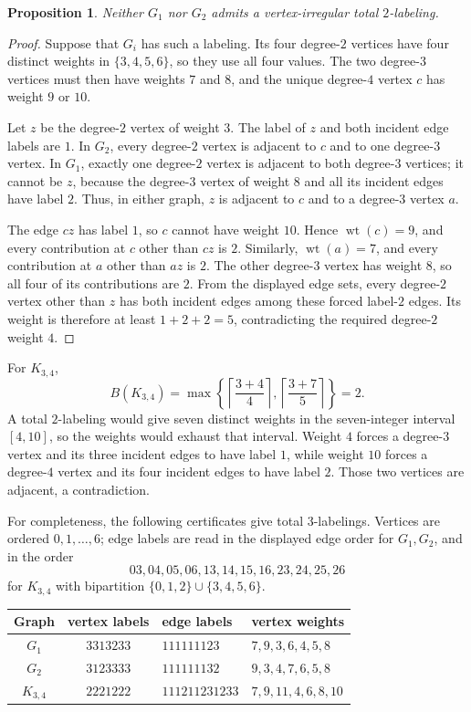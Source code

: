 \documentclass[11pt]{amsart}
\newtheorem{proposition}[theorem]{Proposition}
\newcommand{\wt}{\operatorname{wt}}
\begin{document}
\begin{proposition}\label{prop:small}
Neither $G_1$ nor $G_2$ admits a vertex-irregular total $2$-labeling.
\end{proposition}

\begin{proof}
Suppose that $G_i$ has such a labeling. Its four degree-$2$ vertices have
four distinct weights in $\{3,4,5,6\}$, so they use all four values. The
two degree-$3$ vertices must then have weights $7$ and $8$, and the unique
degree-$4$ vertex $c$ has weight $9$ or $10$.

Let $z$ be the degree-$2$ vertex of weight $3$. The label of $z$ and both
incident edge labels are $1$. In $G_2$, every degree-$2$ vertex is adjacent
to $c$ and to one degree-$3$ vertex. In $G_1$, exactly one degree-$2$
vertex is adjacent to both degree-$3$ vertices; it cannot be $z$, because
the degree-$3$ vertex of weight $8$ and all its incident edges have label
$2$. Thus, in either graph, $z$ is adjacent to $c$ and to a degree-$3$
vertex $a$.

The edge $cz$ has label $1$, so $c$ cannot have weight $10$. Hence
$\wt(c)=9$, and every contribution at $c$ other than $cz$ is $2$.
Similarly, $\wt(a)=7$, and every contribution at $a$ other than $az$ is
$2$. The other degree-$3$ vertex has weight $8$, so all four of its
contributions are $2$. From the displayed edge sets, every degree-$2$
vertex other than $z$ has both incident edges among these forced
label-$2$ edges. Its weight is therefore at least $1+2+2=5$, contradicting
the required degree-$2$ weight $4$.
\end{proof}

For $K_{3,4}$,
\[
 B(K_{3,4})=
 \max\left\{
 \left\lceil\frac{3+4}{4}\right\rceil,
 \left\lceil\frac{3+7}{5}\right\rceil
 \right\}=2.
\]
A total $2$-labeling would give seven distinct weights in the
seven-integer interval $[4,10]$, so the weights would exhaust that
interval. Weight $4$ forces a degree-$3$ vertex and its three incident
edges to have label $1$, while weight $10$ forces a degree-$4$ vertex and
its four incident edges to have label $2$. Those two vertices are
adjacent, a contradiction.

For completeness, the following certificates give total $3$-labelings.
Vertices are ordered $0,1,\ldots,6$; edge labels are read in the displayed
edge order for $G_1,G_2$, and in the order
\[
  03,04,05,06,13,14,15,16,23,24,25,26
\]
for $K_{3,4}$ with bipartition
$\{0,1,2\}\cup\{3,4,5,6\}$.

\begin{center}
\small
\begin{tabular}{@{}ccll@{}}
\toprule
Graph & vertex labels & edge labels & vertex weights \\
\midrule
$G_1$     & $3313233$ & $111111123$    & $7,9,3,6,4,5,8$ \\
$G_2$     & $3123333$ & $111111132$    & $9,3,4,7,6,5,8$ \\
$K_{3,4}$ & $2221222$ & $111211231233$ & $7,9,11,4,6,8,10$ \\
\bottomrule
\end{tabular}
\end{center}
\end{document}
